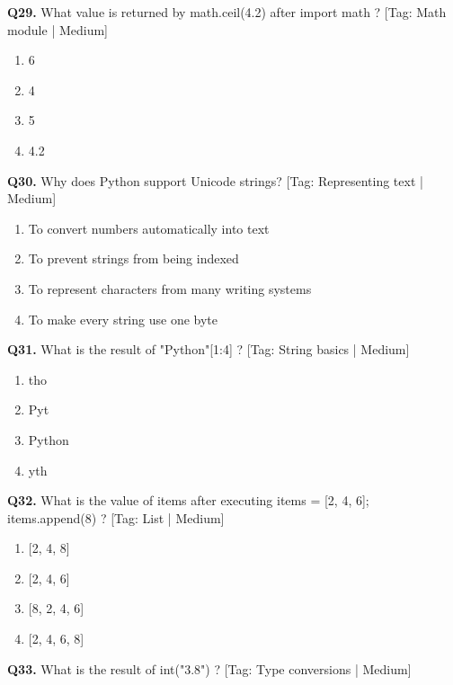 \vspace{2mm}
\noindent\textbf{Q29.} What value is returned by math.ceil(4.2) after import math ? \hfill [Tag: Math module | Medium]
\begin{enumerate}[label=(\alph*),topsep=2pt,itemsep=1pt,partopsep=0pt,parsep=0pt]
    \item {6}
    \item {4}
    \item {5}
    \item {4.2}
\end{enumerate}
\vspace{2mm}
\noindent\textbf{Q30.} Why does Python support Unicode strings? \hfill [Tag: Representing text | Medium]
\begin{enumerate}[label=(\alph*),topsep=2pt,itemsep=1pt,partopsep=0pt,parsep=0pt]
    \item {To convert numbers automatically into text}
    \item {To prevent strings from being indexed}
    \item {To represent characters from many writing systems}
    \item {To make every string use one byte}
\end{enumerate}
\vspace{2mm}
\noindent\textbf{Q31.} What is the result of "Python"[1:4] ? \hfill [Tag: String basics | Medium]
\begin{enumerate}[label=(\alph*),topsep=2pt,itemsep=1pt,partopsep=0pt,parsep=0pt]
    \item {tho}
    \item {Pyt}
    \item {Python}
    \item {yth}
\end{enumerate}
\vspace{2mm}
\noindent\textbf{Q32.} What is the value of items after executing items = [2, 4, 6]; items.append(8) ? \hfill [Tag: List | Medium]
\begin{enumerate}[label=(\alph*),topsep=2pt,itemsep=1pt,partopsep=0pt,parsep=0pt]
    \item {[2, 4, 8]}
    \item {[2, 4, 6]}
    \item {[8, 2, 4, 6]}
    \item {[2, 4, 6, 8]}
\end{enumerate}
\vspace{2mm}
\noindent\textbf{Q33.} What is the result of int("3.8") ? \hfill [Tag: Type conversions | Medium]
